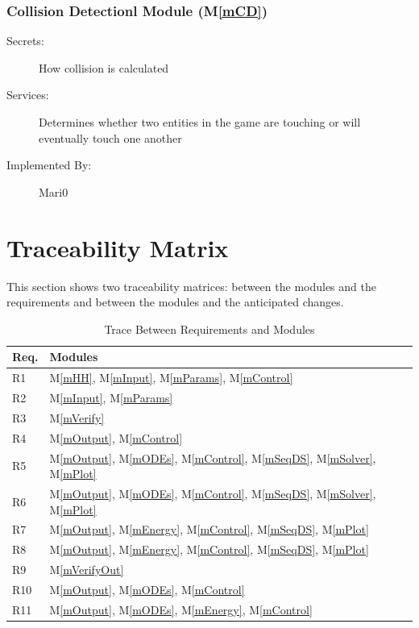 \documentclass[12pt, titlepage]{article}
\newcommand{\mref}[1]{M\ref{#1}}
\begin{document}
\subsubsection{Collision Detectionl Module (\mref{mCD})}
\begin{description}
\item[Secrets:]How collision is calculated
\item[Services:]Determines whether two entities in the game are touching or will eventually touch one another
\item[Implemented By:] Mari0
\end{description}

\section{Traceability Matrix} \label{SecTM}

This section shows two traceability matrices: between the modules and the
requirements and between the modules and the anticipated changes.

\begin{table}[H]
\centering
\begin{tabular}{p{} p{}}
\toprule
\textbf{Req.} & \textbf{Modules}\\
\midrule
R1 & \mref{mHH}, \mref{mInput}, \mref{mParams}, \mref{mControl}\\
R2 & \mref{mInput}, \mref{mParams}\\
R3 & \mref{mVerify}\\
R4 & \mref{mOutput}, \mref{mControl}\\
R5 & \mref{mOutput}, \mref{mODEs}, \mref{mControl}, \mref{mSeqDS}, \mref{mSolver}, \mref{mPlot}\\
R6 & \mref{mOutput}, \mref{mODEs}, \mref{mControl}, \mref{mSeqDS}, \mref{mSolver}, \mref{mPlot}\\
R7 & \mref{mOutput}, \mref{mEnergy}, \mref{mControl}, \mref{mSeqDS}, \mref{mPlot}\\
R8 & \mref{mOutput}, \mref{mEnergy}, \mref{mControl}, \mref{mSeqDS}, \mref{mPlot}\\
R9 & \mref{mVerifyOut}\\
R10 & \mref{mOutput}, \mref{mODEs}, \mref{mControl}\\
R11 & \mref{mOutput}, \mref{mODEs}, \mref{mEnergy}, \mref{mControl}\\
\bottomrule
\end{tabular}
\caption{Trace Between Requirements and Modules}
\label{TblRT}
\end{table}
\end{document}
